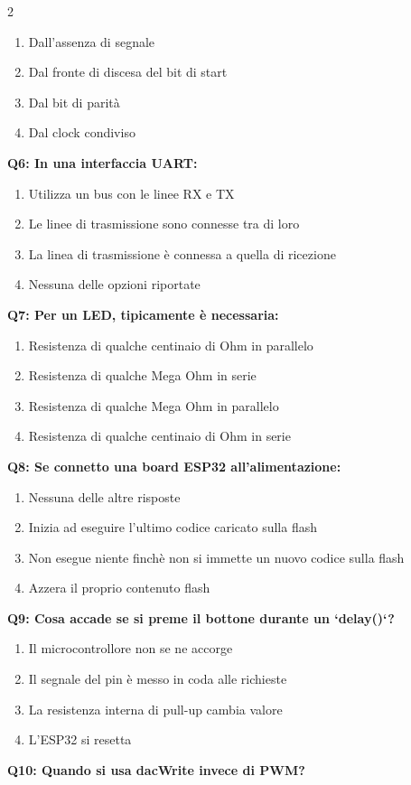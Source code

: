 \documentclass[10pt]{article}
\begin{document}
\begin{multicols}{2}
\begin{enumerate}[label=\arabic*.]
\item Dall’assenza di segnale
\item Dal fronte di discesa del bit di start
\item Dal bit di parità
\item Dal clock condiviso
\end{enumerate}
\textbf{Q6: In una interfaccia UART:}

\begin{enumerate}[label=\arabic*.]
\item Utilizza un bus con le linee RX e TX
\item Le linee di trasmissione sono connesse tra di loro
\item La linea di trasmissione è connessa a quella di ricezione
\item Nessuna delle opzioni riportate
\end{enumerate}
\textbf{Q7: Per un LED, tipicamente è necessaria:}

\begin{enumerate}[label=\arabic*.]
\item Resistenza di qualche centinaio di Ohm in parallelo
\item Resistenza di qualche Mega Ohm in serie
\item Resistenza di qualche Mega Ohm in parallelo
\item Resistenza di qualche centinaio di Ohm in serie
\end{enumerate}
\textbf{Q8: Se connetto una board ESP32 all'alimentazione:}

\begin{enumerate}[label=\arabic*.]
\item Nessuna delle altre risposte
\item Inizia ad eseguire l'ultimo codice caricato sulla flash
\item Non esegue niente finchè non si immette un nuovo codice sulla flash
\item Azzera il proprio contenuto flash
\end{enumerate}
\textbf{Q9: Cosa accade se si preme il bottone durante un `delay()`?}

\begin{enumerate}[label=\arabic*.]
\item Il microcontrollore non se ne accorge
\item Il segnale del pin è messo in coda alle richieste
\item La resistenza interna di pull-up cambia valore
\item L’ESP32 si resetta
\end{enumerate}
\textbf{Q10: Quando si usa dacWrite invece di PWM?}


\end{multicols}
\end{document}
